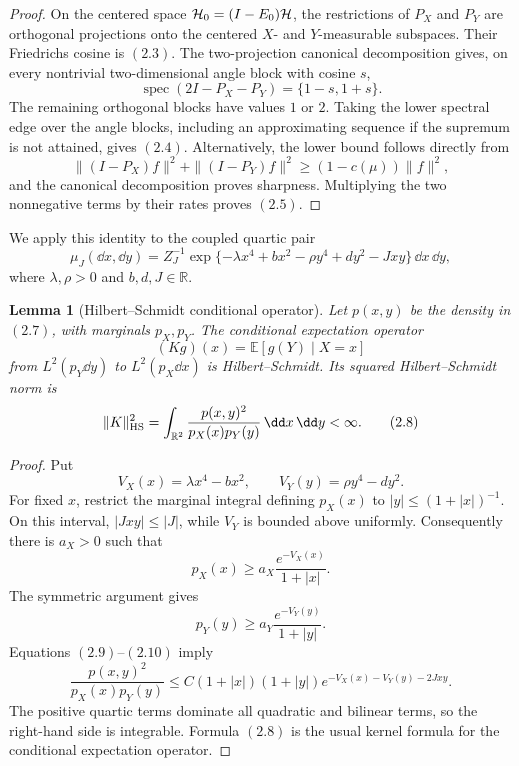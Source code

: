 \documentclass[11pt]{article}
\newtheorem{lemma}[theorem]{Lemma}
\theoremstyle{remark}
\begin{document}
\begin{proof}
On the centered space \({\cal H}_0=(I-E_0){\cal H}\), the
restrictions of \(P_X\) and \(P_Y\) are orthogonal projections
onto the centered \(X\)- and \(Y\)-measurable subspaces.  Their
Friedrichs cosine is \((2.3)\).  The two-projection canonical
decomposition gives, on every nontrivial two-dimensional angle
block with cosine \(s\),
\[
 \operatorname{spec}(2I-P_X-P_Y)=\{1-s,1+s\}.                \tag{2.6}
\]
The remaining orthogonal blocks have values \(1\) or \(2\).
Taking the lower spectral edge over the angle blocks, including an
approximating sequence if the supremum is not attained, gives
\((2.4)\).  Alternatively, the lower bound follows directly from
\[
 \|(I-P_X)f\|^2+\|(I-P_Y)f\|^2
 \ge(1-c(\mu))\|f\|^2,
\]
and the canonical decomposition proves sharpness.  Multiplying the
two nonnegative terms by their rates proves \((2.5)\).
\end{proof}

We apply this identity to the coupled quartic pair
\[
 \mu_J(\dd x,\dd y)
 =Z_J^{-1}\exp\{
 -\lambda x^4+bx^2-\rho y^4+dy^2-Jxy
 \}\,\dd x\,\dd y,                                           \tag{2.7}
\]
where \(\lambda,\rho>0\) and \(b,d,J\in\mathbb R\).

\begin{lemma}[Hilbert--Schmidt conditional operator]
\label{lem:v15v2-hs}
Let \(p(x,y)\) be the density in \((2.7)\), with marginals
\(p_X,p_Y\).  The conditional expectation operator
\[
 (Kg)(x)=\mathbb E[g(Y)\mid X=x]
\]
from \(L^2(p_Y\dd y)\) to \(L^2(p_X\dd x)\) is
Hilbert--Schmidt.  Its squared Hilbert--Schmidt norm is
\[
 \|K\|_{\rm HS}^2
 =\int_{\mathbb R^2}
   \frac{p(x,y)^2}{p_X(x)p_Y(y)}\,\dd x\,\dd y<\infty.        \tag{2.8}
\]
\end{lemma}

\begin{proof}
Put
\[
 V_X(x)=\lambda x^4-bx^2,\qquad
 V_Y(y)=\rho y^4-dy^2.
\]
For fixed \(x\), restrict the marginal integral defining \(p_X(x)\)
to \(|y|\le(1+|x|)^{-1}\).  On this interval,
\(|Jxy|\le|J|\), while \(V_Y\) is bounded above uniformly.
Consequently there is \(a_X>0\) such that
\[
 p_X(x)\ge
 a_X\frac{e^{-V_X(x)}}{1+|x|}.                               \tag{2.9}
\]
The symmetric argument gives
\[
 p_Y(y)\ge
 a_Y\frac{e^{-V_Y(y)}}{1+|y|}.                               \tag{2.10}
\]
Equations \((2.9)\)--\((2.10)\) imply
\[
 \frac{p(x,y)^2}{p_X(x)p_Y(y)}
 \le C(1+|x|)(1+|y|)
 e^{-V_X(x)-V_Y(y)-2Jxy}.                                   \tag{2.11}
\]
The positive quartic terms dominate all quadratic and bilinear
terms, so the right-hand side is integrable.  Formula \((2.8)\)
is the usual kernel formula for the conditional expectation
operator.
\end{proof}
\end{document}
